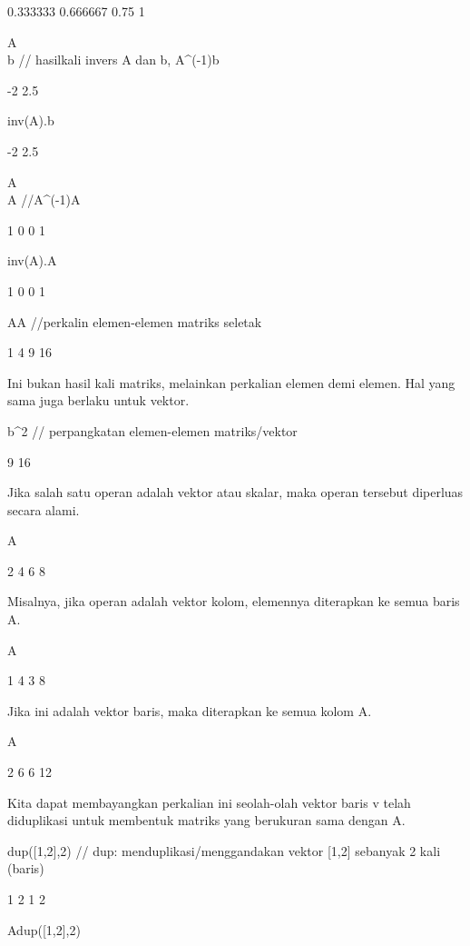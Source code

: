 \documentclass{article}
\begin{document}
         0.333333      0.666667 
             0.75             1 

\>A\\b // hasilkali invers A dan b, A^(-1)b 


               -2 
              2.5 

\>inv(A).b


               -2 
              2.5 

\>A\\A   //A^(-1)A


                1             0 
                0             1 

\>inv(A).A


                1             0 
                0             1 

\>A\*A //perkalin elemen-elemen matriks seletak


                1             4 
                9            16 

Ini bukan hasil kali matriks, melainkan perkalian elemen demi elemen.
Hal yang sama juga berlaku untuk vektor.


\>b^2 // perpangkatan elemen-elemen matriks/vektor


                9 
               16 

Jika salah satu operan adalah vektor atau skalar, maka operan tersebut
diperluas secara alami.


\*A


                2             4 
                6             8 

Misalnya, jika operan adalah vektor kolom, elemennya diterapkan ke
semua baris A.


\>[1,2]\*A


                1             4 
                3             8 

Jika ini adalah vektor baris, maka diterapkan ke semua kolom A.


\>A\*[2,3]


                2             6 
                6            12 

Kita dapat membayangkan perkalian ini seolah-olah vektor baris v telah
diduplikasi untuk membentuk matriks yang berukuran sama dengan A.


\>dup([1,2],2) // dup: menduplikasi/menggandakan vektor [1,2] sebanyak 2 kali (baris)


                1             2 
                1             2 

\>A\*dup([1,2],2) 
\end{document}
